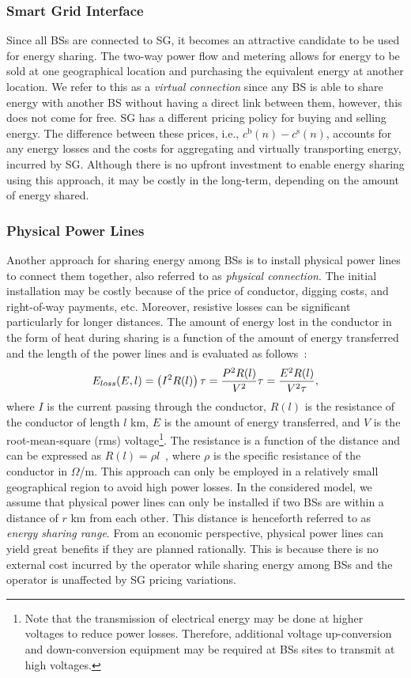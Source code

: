 \documentclass[10pt, letter,twocolumn]{IEEEtran}
\begin{document}
\subsubsection{\textbf{Smart Grid Interface}}
Since all BSs are connected to SG, it becomes an attractive candidate to be used for energy sharing. The two-way power flow and metering allows for energy to be sold at one geographical location and purchasing the equivalent energy at another location. We refer to this as a \emph{virtual connection} since any BS is able to share energy with another BS without having a direct link between them, however, this does not come for free. SG has a different pricing policy for buying and selling energy. The difference between these prices, i.e., $c^{\text{b}}(n) - c^{\text{s}}(n)$, accounts for any energy losses and the costs for aggregating and virtually transporting energy, incurred by SG. Although there is no upfront investment to enable energy sharing using this approach, it may be costly in the long-term, depending on the amount of energy shared.


\subsubsection{\textbf{Physical Power Lines}}
Another approach for sharing energy among BSs is to install physical power lines to connect them together, also referred to as \emph{physical connection}. The initial installation may be costly because of the price of conductor, digging costs, and right-of-way payments, etc. Moreover, resistive losses can be significant particularly for longer distances. The amount of energy lost in the conductor in the form of heat during sharing is a function of the amount of energy transferred and the length of the power lines and is evaluated as follows~\cite{joule_heating}:
\begin{equation}\label{P_loss}
\small
  E_{loss}(E,l) = \left( I^{2}R(l) \right) \tau = \frac{P^2 R(l)}{V^2} \tau = \frac{E^{2} R(l)}{V^{2} \tau},
\end{equation}
where $I$ is the current passing through the conductor, $R(l)$ is the resistance of the conductor of length $l$ km, $E$ is the amount of energy transferred, and $V$ is the root-mean-square (rms) voltage\footnote{Note that the transmission of electrical energy may be done at higher voltages
to reduce power losses. Therefore, additional voltage up-conversion and down-conversion equipment may be required at BSs sites to transmit at high voltages.}. The resistance is a function of the distance and can be expressed as $R(l) = \rho l$~\cite{joule_heating}, where $\rho$ is the specific resistance of the conductor in $\Omega$/m. This approach can only be employed in a relatively small geographical region to avoid high power losses. In the considered model, we assume that physical power lines can only be installed if two BSs are within a distance of $r$ km from each other. This distance is henceforth referred to as \emph{energy sharing range}. From an economic perspective, physical power lines can yield great benefits if they are planned rationally. This is because there is no external cost incurred by the operator while sharing energy among BSs and the operator is unaffected by SG pricing variations.
\end{document}
